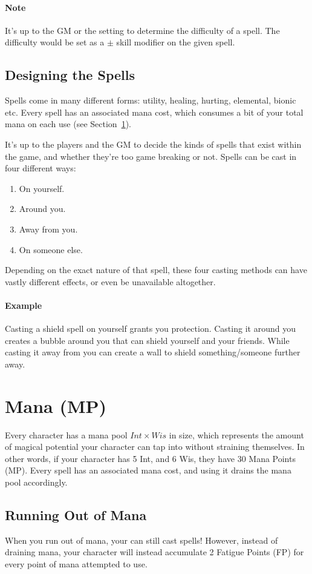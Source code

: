 \paragraph{Note} It's up to the GM or the setting to determine the difficulty of a spell.
The difficulty would be set as a $\pm$ skill modifier on the given spell.

\subsection{Designing the Spells}
Spells come in many different forms: utility, healing, hurting, elemental, bionic etc.
Every spell has an associated mana cost, which consumes a bit of your total mana on each use (see Section~\ref{sec:mana}).

It's up to the players and the GM to decide the kinds of spells that exist within the game, and whether they're too game breaking or not.
Spells can be cast in four different ways:
\begin{enumerate}
  \item On yourself.
  \item Around you.
  \item Away from you.
  \item On someone else.
\end{enumerate}
Depending on the exact nature of that spell, these four casting methods can have vastly different effects, or even be unavailable altogether.

\paragraph{Example} Casting a shield spell on yourself grants you protection.
Casting it around you creates a bubble around you that can shield yourself and your friends.
While casting it away from you can create a wall to shield something/someone further away.

\section{Mana (MP)}\label{sec:mana}
Every character has a mana pool $Int \times Wis$ in size, which represents the amount of magical potential your character can tap into without straining themselves.
In other words, if your character has 5 Int, and 6 Wis, they have 30 Mana Points (MP).
Every spell has an associated mana cost, and using it drains the mana pool accordingly.

\subsection{Running Out of Mana}
When you run out of mana, your can still cast spells!
However, instead of draining mana, your character will instead accumulate 2 Fatigue Points (FP) for every point of mana attempted to use.

